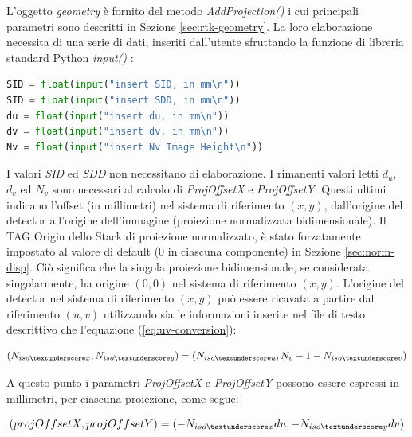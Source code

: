 \documentclass[a4paper,12pt, doubleside]{report}
\begin{document}
                L'oggetto \textit{geometry} è fornito del metodo \textit{AddProjection()} i cui principali parametri sono descritti in Sezione \ref{sec:rtk-geometry}. La loro elaborazione necessita di una serie di dati, inseriti dall'utente sfruttando la funzione di libreria standard Python \textit{input()} \cite{input-python}:
                    
                \begin{lstlisting}[language=python, frame=bt]
SID = float(input("insert SID, in mm\n"))
SID = float(input("insert SDD, in mm\n"))
du = float(input("insert du, in mm\n"))
dv = float(input("insert dv, in mm\n"))
Nv = float(input("insert Nv Image Height\n"))
                \end{lstlisting}
                    
                I valori \textit{SID} ed \textit{SDD} non necessitano di elaborazione. I rimanenti valori letti $d_u$, $d_v$ ed $N_v$ sono necessari al calcolo di \textit{ProjOffsetX} e \textit{ProjOffsetY}. Questi ultimi indicano l'offset (in millimetri) nel sistema di riferimento $(x,y)$, dall'origine del detector all'origine dell'immagine (proiezione normalizzata bidimensionale). Il TAG Origin dello Stack di proiezione normalizzato, è stato forzatamente impostato al valore di default ($0$ in ciascuna componente) in Sezione \ref{sec:norm-disp}. Ciò significa che la singola proiezione bidimensionale, se considerata singolarmente, ha origine $(0,0)$ nel sistema di riferimento $(x,y)$. L'origine del detector nel sistema di riferimento $(x,y)$ può essere ricavata a partire dal riferimento $(u,v)$ utilizzando sia le informazioni inserite nel file di testo descrittivo che l'equazione (\ref{eq:uv-conversion}):
                    
                \begin{equation}
                    (N_{iso\textunderscore x}, N_{iso\textunderscore y}) = (N_{iso\textunderscore u} , N_v - 1 - N_{iso\textunderscore v})
                \end{equation}
                    
                A questo punto i parametri \textit{ProjOffsetX} e \textit{ProjOffsetY} possono essere espressi in millimetri, per ciascuna proiezione, come segue:
                
                \begin{equation}
                    (projOffsetX, projOffsetY) = (- N_{iso\textunderscore x} du, - N_{iso\textunderscore y} dv)
                \end{equation}
                    
\end{document}
